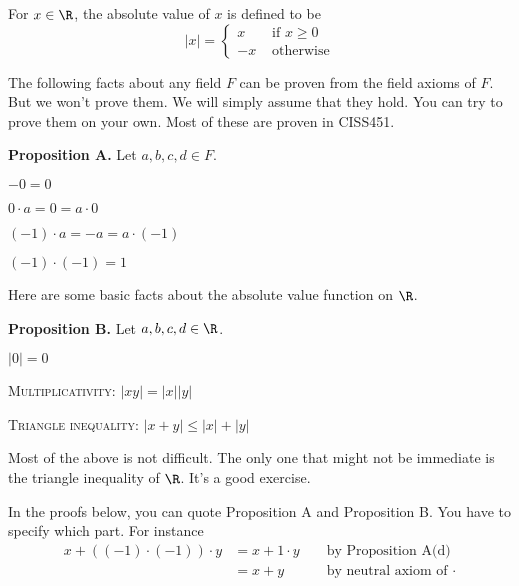 For $x \in \R$, the absolute value of $x$ is defined to be
\[
|x|
=
\begin{cases}
  x  & \text{ if $x \geq 0$} \\
  -x & \text{ otherwise}
\end{cases}
\]

The following facts about any field $F$ can be proven from the field axioms of
$F$.
But we won't prove them.
We will simply assume that they hold.
You can try to prove them on your own. Most of these are proven in CISS451.

\textbf{Proposition A.}
Let $a, b, c, d \in F$.
\begin{myenumt}
\item $-0 = 0$
\item $0 \cdot a = 0 = a \cdot 0$
\item $(-1) \cdot a = -a = a \cdot (-1)$
\item $(-1) \cdot (-1) = 1$
\end{myenumt}

Here are some basic facts about the absolute value function on $\R$.

\textbf{Proposition B.}
Let $a, b, c, d \in \R$.
\begin{myenumt}
\item $|0| = 0$
\item \textsc{Multiplicativity}: $|xy| = |x| |y|$
\item \textsc{Triangle inequality}: $|x + y| \leq |x| + |y|$
\end{myenumt}

Most of the above is not difficult.
The only one that might not be immediate is the triangle inequality of
$\R$.
It's a good exercise.

In the proofs below, you can quote Proposition A and Proposition B.
You have to specify which part.
For instance
\begin{align*}
x + ((-1) \cdot (-1)) \cdot y
&= x + 1 \cdot y  & & \text{ by Proposition A(d)} \\
&= x + y  & & \text{ by neutral axiom of $\cdot$} \\
\end{align*}
